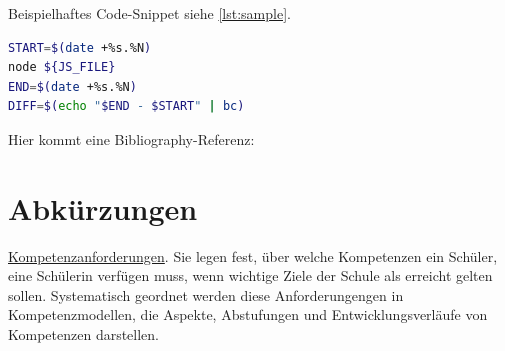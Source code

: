\documentclass[
12pt,
english,
ngerman,
headsepline,
twoside,
openright,
numbers=noenddot,version=first
]{scrreprt}
\begin{document}
Beispielhaftes Code-Snippet siehe \autoref{lst:sample}.

\begin{lstlisting}[language=bash,caption={Aufnahme der \glqq real\grqq-Zeit},label={lst:sample}]
START=$(date +%s.%N)
node ${JS_FILE}
END=$(date +%s.%N)
DIFF=$(echo "$END - $START" | bc)
\end{lstlisting}

Hier kommt eine Bibliography-Referenz: \cite{booch2007object}

\lstlistoflistings

\listoffigures

\listoftables

\chapter*{Abkürzungen}









\underline{Kompetenzanforderungen}. Sie legen fest, über welche Kompetenzen ein Schüler, eine Schülerin verfügen muss, wenn wichtige Ziele der Schule als erreicht gelten sollen. Systematisch geordnet werden diese Anforderungengen in Kompetenzmodellen, die Aspekte, Abstufungen und Entwicklungsverläufe von Kompetenzen darstellen.
\end{document}
